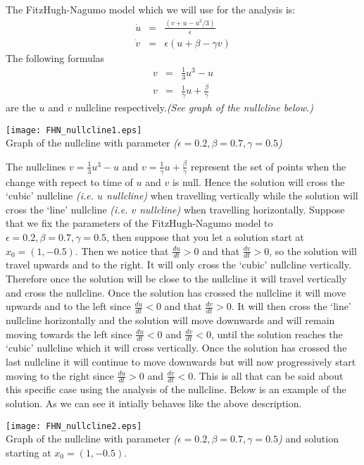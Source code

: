 \documentclass[12pt]{article}
\begin{document}

The FitzHugh-Nagumo model which we will use for the analysis is:
\begin{eqnarray*}
\dot{u} &=& \frac{(v+u-u^3/3)}{\epsilon}\\
\dot{v} &=& \epsilon(u+\beta-\gamma v)
\end{eqnarray*}
The following formulas
\begin{eqnarray*}
v &=& \frac{1}{3}u^3 - u\\
v &=& \frac{1}{\gamma}u + \frac{\beta}{\gamma}
\end{eqnarray*}
are the $u$ and $v$ nullcline respectively.\textit{(See graph of the nullcline below.)}
\begin{center}
\texttt{[image: FHN\_nullcline1.eps]}\\
\small Graph of the nullcline with parameter \textit{($\epsilon=0.2,\beta=0.7,\gamma=0.5$)}
\end{center} 
The nullclines $v=\frac{1}{3}u^3 - u$ and $v=\frac{1}{\gamma}u + \frac{\beta}{\gamma}$
 represent the set of points when the change with repect to time of $u$ and $v$ is null.  Hence the solution will cross the `cubic' nullcline \textit{(i.e. $u$ nullcline)} when travelling vertically while the solution will cross the `line' nullcline \textit{(i.e. $v$ nullcline)} when travelling horizontally.  Suppose that we fix the parameters of the FitzHugh-Nagumo model to $\epsilon=0.2,\beta=0.7,\gamma=0.5$, then suppose that you let a solution start at $x_0 = (1,-0.5)$.  Then we notice that $\frac{du}{dt}>0$ and that $\frac{dv}{dt}>0$, so the solution will travel upwards and to the right.  It will only cross the `cubic' nullcline vertically.  Therefore once the solution will be close to the nullcline it will travel vertically and cross the nullcline.  Once the solution has crossed the nullcline it will move upwards and to the left since $\frac{du}{dt}<0$ and that $\frac{dv}{dt}>0$. It will then cross the `line' nullcline horizontally and the solution will move downwards and will remain moving towards the left since $\frac{du}{dt}<0$ and $\frac{dv}{dt}<0$, until the solution reaches the `cubic' nullcline which it will cross vertically.  Once the solution has crossed the last nullcline it will continue to move downwards but will now progressively start moving to the right since $\frac{du}{dt}>0$ and $\frac{dv}{dt}<0$.  This is all that can be said about this specific case using the analysis of the nullcline.  Below is an example of the solution.  As we can see it intially behaves like the above description. 
\begin{center}
\texttt{[image: FHN\_nullcline2.eps]}\\
\small Graph of the nullcline with parameter \textit{($\epsilon=0.2,\beta=0.7,\gamma=0.5$)} and solution starting at $x_0=(1,-0.5)$.
\end{center}
\end{document}
